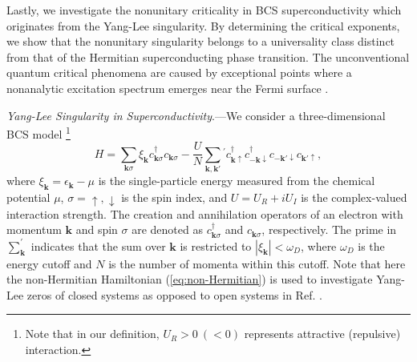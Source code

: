 \documentclass[aps,prl,twocolumn,superscriptaddress]{revtex4-1}
\begin{document}
Lastly, we investigate the nonunitary criticality in BCS superconductivity which originates from the Yang-Lee singularity. By determining the critical exponents, we show that the nonunitary singularity belongs to a universality
class distinct from that of the Hermitian superconducting phase transition. The unconventional quantum critical phenomena are caused by exceptional points where a nonanalytic excitation spectrum emerges near the Fermi surface \cite{Yamamoto2019}.

\emph{Yang-Lee Singularity in Superconductivity}.---We consider a three-dimensional
BCS model \cite{Yamamoto2019}\footnote{Note that in our definition, $U_{R}>0\:(<0)$ represents attractive
(repulsive) interaction.} 
\begin{equation}
H=\sum_{\boldsymbol{k}\sigma}\xi_{\boldsymbol{k}}c_{\boldsymbol{k}\sigma}^{\dagger}c_{\boldsymbol{k}\sigma}-\frac{U}{N}\sum_{\bm{k},\bm{k}'}{}^{'}c_{\bm{k}\uparrow}^{\dagger}c_{\bm{-k}\downarrow}^{\dagger}c_{\bm{-k}'\downarrow}c_{\bm{k}'\uparrow},\label{eq:non-Hermitian}
\end{equation}
where $\xi_{\boldsymbol{k}}=\epsilon_{\bm{k}}-\mu$ is the single-particle
energy measured from the chemical potential $\mu$, $\sigma=\uparrow,\downarrow$
is the spin index, and $U=U_{R}+iU_{I}$ is the complex-valued
interaction strength. %
The creation and annihilation operators of an electron with momentum $\bm{k}$ and spin $\sigma$ are denoted as $c_{\bm{k}\sigma}^{\dagger}$
and $c_{\bm{k}\sigma}$, respectively. The prime in $\sum_{\bm{k}}^{'}$
indicates that the sum over $\bm{k}$ is restricted to $|\xi_{\boldsymbol{k}}|<\omega_{D}$,
where $\omega_{D}$ is the energy cutoff and $N$ is the number of momenta within this cutoff. Note that here the non-Hermitian Hamiltonian (\ref{eq:non-Hermitian}) is used to investigate Yang-Lee zeros of closed systems as opposed to open systems in Ref. \cite{Yamamoto2019}. 
\end{document}
